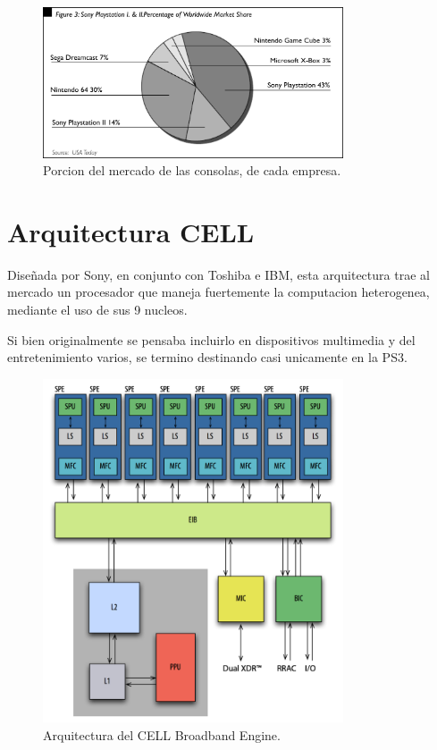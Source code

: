 \documentclass[10pt,compsoc]{IEEEtran}
\begin{document}
	

	\begin{figure}[H]
	\centering
	\includegraphics[width=3.5in]{imgs/marketshare.png}
	\caption{Porcion del mercado de las consolas, de cada empresa.}
	\label{fig1}
	\end{figure}	
	
	
	\section{Arquitectura CELL}	%
	\noindent Diseñada por Sony, en conjunto con Toshiba e IBM, esta arquitectura trae al mercado un procesador que maneja fuertemente la computacion heterogenea, mediante el uso de sus 9 nucleos. 
	
	Si bien originalmente se pensaba incluirlo en dispositivos multimedia y del entretenimiento varios, se termino destinando casi unicamente en la PS3.\newline
	
	\begin{figure}[H]
	\centering
	\includegraphics[width=3.5in]{imgs/arquitecturacell.png}
	\caption{Arquitectura del CELL Broadband Engine.}
	\label{fig3}
	\end{figure}
	
\end{document}
